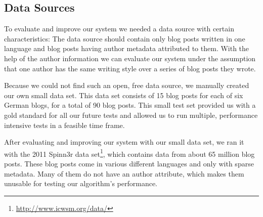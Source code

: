 
\subsection{Data Sources}
\label{sec:data_sources}


To evaluate and improve our system we needed a data source with certain characteristics:
The data source should contain only blog posts written in one language and blog posts having author metadata attributed to them.
With the help of the author information we can evaluate our system under the assumption that one author has the same writing style over a series of blog posts they wrote.

Because we could not find such an open, free data source, we manually created our own small data set.
This data set consists of 15 blog posts for each of six German blogs, for a total of 90 blog posts.
This small test set provided us with a gold standard for all our future tests and allowed us to run multiple, performance intensive tests in a feasible time frame.

After evaluating and improving our system with our small data set, we ran it with the 2011 Spinn3r data set\footnote{\url{http://www.icwsm.org/data/}}, which contains data from about 65 million blog posts.
These blog posts come in various different languages and only with sparse metadata.
Many of them do not have an author attribute, which makes them unusable for testing our algorithm's performance.


